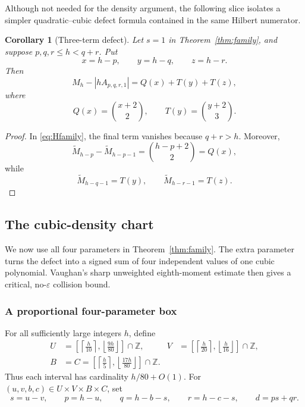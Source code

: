 \documentclass[11pt,reqno]{amsart}
\newtheorem{corollary}[theorem]{Corollary}
\theoremstyle{definition}
\theoremstyle{remark}
\newcommand{\Z}{\mathbb Z}
\begin{document}
Although not needed for the density argument, the following slice isolates
a simpler quadratic--cubic defect formula contained in the same Hilbert
numerator.

\begin{corollary}[Three-term defect]\label{cor:defect}
Let $s=1$ in Theorem~\ref{thm:family}, and suppose
$p,q,r\leq h<q+r$.  Put
\[
 x=h-p,\qquad y=h-q,\qquad z=h-r.
\]
Then
\begin{equation}\label{eq:three-term}
 M_h-|hA_{p,q,r,1}|
 =Q(x)+T(y)+T(z),
\end{equation}
where
\[
 Q(x)=\binom{x+2}{2},\qquad T(y)=\binom{y+2}{3}.
\]
\end{corollary}

\begin{proof}
In \eqref{eq:Hfamily}, the final term vanishes because $q+r>h$.
Moreover,
\[
 \widetilde M_{h-p}-\widetilde M_{h-p-1}
 =\binom{h-p+2}{2}=Q(x),
\]
while
\[
 \widetilde M_{h-q-1}=T(y),\qquad
 \widetilde M_{h-r-1}=T(z).
\]
\end{proof}

\subsection{The cubic-density chart}\label{sec:energy}

We now use all four parameters in Theorem~\ref{thm:family}.  The extra
parameter turns the defect into a signed sum of four independent values of
one cubic polynomial.  Vaughan's sharp unweighted eighth-moment estimate
then gives a critical, no-$\varepsilon$ collision bound.

\subsubsection{A proportional four-parameter box}

For all sufficiently large integers $h$, define
\begin{align}
 U&=\left[\left\lceil\frac h{10}\right\rceil,
          \left\lfloor\frac{9h}{80}\right\rfloor\right]\cap\Z,
 &V&=\left[\left\lceil\frac h{20}\right\rceil,
          \left\lfloor\frac h{16}\right\rfloor\right]\cap\Z,
                                                        \label{eq:UVbox}\\
 B&=C=\left[\left\lceil\frac h5\right\rceil,
          \left\lfloor\frac{17h}{80}\right\rfloor\right]\cap\Z.
                                                        \label{eq:BCbox}
\end{align}
Thus each interval has cardinality $h/80+O(1)$.  For
$(u,v,b,c)\in U\times V\times B\times C$, set
\begin{equation}\label{eq:fullsparams}
 s=u-v,\qquad p=h-u,\qquad
 q=h-b-s,\qquad r=h-c-s,
 \qquad d=ps+qr.
\end{equation}
\end{document}
